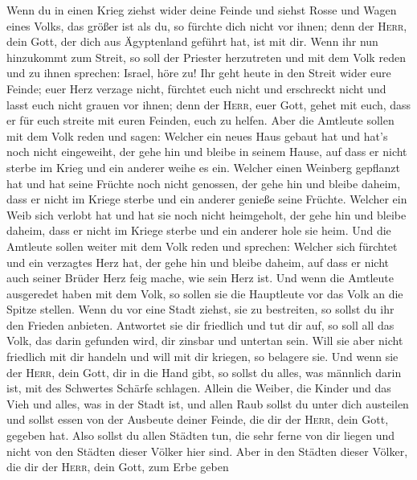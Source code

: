  Wenn du in einen Krieg ziehst wider deine Feinde und
siehst Rosse und Wagen eines Volks, das größer ist als du, so fürchte
dich nicht vor ihnen; denn der \textsc{Herr}, dein Gott, der dich aus
Ägyptenland geführt hat, ist mit dir.  Wenn ihr nun
hinzukommt zum Streit, so soll der Priester herzutreten und mit dem Volk
reden  und zu ihnen sprechen: Israel, höre zu! Ihr geht
heute in den Streit wider eure Feinde; euer Herz verzage nicht, fürchtet
euch nicht und erschreckt nicht und lasst euch nicht grauen vor ihnen;
 denn der \textsc{Herr}, euer Gott, gehet mit euch, dass
er für euch streite mit euren Feinden, euch zu helfen. 
Aber die Amtleute sollen mit dem Volk reden und sagen: Welcher ein neues
Haus gebaut hat und hat's noch nicht eingeweiht, der gehe hin und bleibe
in seinem Hause, auf dass er nicht sterbe im Krieg und ein anderer weihe
es ein.  Welcher einen Weinberg gepflanzt hat und hat
seine Früchte noch nicht genossen, der gehe hin und bleibe daheim, dass
er nicht im Kriege sterbe und ein anderer genieße seine Früchte.
 Welcher ein Weib sich verlobt hat und hat sie noch nicht
heimgeholt, der gehe hin und bleibe daheim, dass er nicht im Kriege
sterbe und ein anderer hole sie heim.  Und die Amtleute
sollen weiter mit dem Volk reden und sprechen: Welcher sich fürchtet und
ein verzagtes Herz hat, der gehe hin und bleibe daheim, auf dass er
nicht auch seiner Brüder Herz feig mache, wie sein Herz ist.
 Und wenn die Amtleute ausgeredet haben mit dem Volk, so
sollen sie die Hauptleute vor das Volk an die Spitze stellen.
 Wenn du vor eine Stadt ziehst, sie zu bestreiten, so
sollst du ihr den Frieden anbieten.  Antwortet sie dir
friedlich und tut dir auf, so soll all das Volk, das darin gefunden
wird, dir zinsbar und untertan sein.  Will sie aber nicht
friedlich mit dir handeln und will mit dir kriegen, so belagere sie.
 Und wenn sie der \textsc{Herr}, dein Gott, dir in die
Hand gibt, so sollst du alles, was männlich darin ist, mit des Schwertes
Schärfe schlagen.  Allein die Weiber, die Kinder und das
Vieh und alles, was in der Stadt ist, und allen Raub sollst du unter
dich austeilen und sollst essen von der Ausbeute deiner Feinde, die dir
der \textsc{Herr}, dein Gott, gegeben hat.  Also sollst
du allen Städten tun, die sehr ferne von dir liegen und nicht von den
Städten dieser Völker hier sind.  Aber in den Städten
dieser Völker, die dir der \textsc{Herr}, dein Gott, zum Erbe geben

